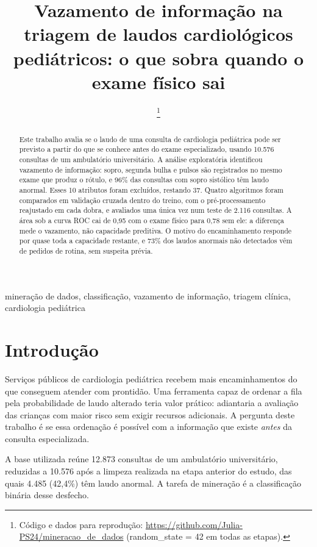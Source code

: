 \documentclass[conference]{IEEEtran}
\begin{document}
\title{Vazamento de informação na triagem de laudos cardiológicos pediátricos: o que sobra quando o exame físico sai}
\author{\thanks{Código e dados para reprodução: \url{https://github.com/Julia-PS24/mineracao_de_dados} (random\_state = 42 em todas as etapas).}}
\maketitle
\begin{abstract}
Este trabalho avalia se o laudo de uma consulta de cardiologia pediátrica pode ser previsto a partir do que se conhece antes do exame especializado, usando 10.576 consultas de um ambulatório universitário. A análise exploratória identificou vazamento de informação: sopro, segunda bulha e pulsos são registrados no mesmo exame que produz o rótulo, e 96\% das consultas com sopro sistólico têm laudo anormal. Esses 10 atributos foram excluídos, restando 37. Quatro algoritmos foram comparados em validação cruzada dentro do treino, com o pré-processamento reajustado em cada dobra, e avaliados uma única vez num teste de 2.116 consultas. A área sob a curva ROC cai de 0,95 com o exame físico para 0,78 sem ele: a diferença mede o vazamento, não capacidade preditiva. O motivo do encaminhamento responde por quase toda a capacidade restante, e 73\% dos laudos anormais não detectados vêm de pedidos de rotina, sem suspeita prévia.
\end{abstract}
\begin{IEEEkeywords}
mineração de dados, classificação, vazamento de informação, triagem clínica, cardiologia pediátrica
\end{IEEEkeywords}
\section{Introdução}
Serviços públicos de cardiologia pediátrica recebem mais encaminhamentos do que conseguem atender com prontidão. Uma ferramenta capaz de ordenar a fila pela probabilidade de laudo alterado teria valor prático: adiantaria a avaliação das crianças com maior risco sem exigir recursos adicionais. A pergunta deste trabalho é se essa ordenação é possível com a informação que existe \textit{antes} da consulta especializada.

A base utilizada reúne 12.873 consultas de um ambulatório universitário, reduzidas a 10.576 após a limpeza realizada na etapa anterior do estudo, das quais 4.485 (42,4\%) têm laudo anormal. A tarefa de mineração é a classificação binária desse desfecho.
\end{document}
